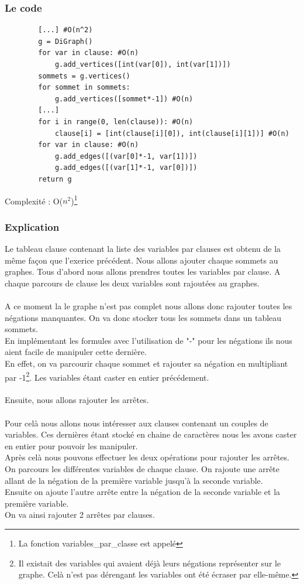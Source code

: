 \documentclass{article}
\begin{document}
    \subsubsection*{Le code}
    \begin{lstlisting}
        [...] #O(n^2)
        g = DiGraph()
        for var in clause: #O(n)
            g.add_vertices([int(var[0]), int(var[1])])
        sommets = g.vertices()
        for sommet in sommets:
            g.add_vertices([sommet*-1]) #O(n)
        [...]
        for i in range(0, len(clause)): #O(n)
            clause[i] = [int(clause[i][0]), int(clause[i][1])] #O(n)
        for var in clause: #O(n)
            g.add_edges([(var[0]*-1, var[1])])
            g.add_edges([(var[1]*-1, var[0])])
        return g
    \end{lstlisting} 
    Complexité : O($n^2$)\footnote{La fonction variables\_par\_classe est appelé}
    \subsubsection*{Explication}
    Le tableau clause contenant la liste des variables par clauses est obtenu de la même façon que l'exerice précédent.
    Nous allons ajouter chaque sommets au graphes. Tous d'abord nous allons prendres toutes les variables par clause. A chaque parcours de clause les deux variables sont rajoutées au graphes. \\
    \\ A ce moment la le graphe n'est pas complet nous allons donc rajouter toutes les négations manquantes. On va donc stocker tous les sommets dans un tableau sommets. \\
    En implémentant les formules avec l'utilisation de "-" pour les négations ils nous aient facile de manipuler cette dernière. \\
    En effet, on va parcourir chaque sommet et rajouter sa négation en multipliant par -1\footnote{Il existait des variables qui avaient déjà leurs négations représenter sur le graphe. Celà n'est pas dérengant les variables ont été écraser par elle-même.}. Les variables étant caster en entier précédement. \\
    \\
    Ensuite, nous allons rajouter les arrêtes. \\
    \\ Pour celà nous allons nous intéresser aux clauses contenant un couples de variables. Ces dernières étant stocké en chaine de caractères nous les avons caster en entier pour pouvoir les manipuler. \\
    Après celà nous pouvons effectuer les deux opérations pour rajouter les arrêtes. \\
    On parcours les différentes variables de chaque clause. On rajoute une arrête allant de la négation de la première variable jusqu'à la seconde variable. \\
    Ensuite on ajoute l'autre arrête entre la négation de la seconde variable et la première variable. \\
    On va ainsi rajouter 2 arrêtes par clauses.
\end{document}
